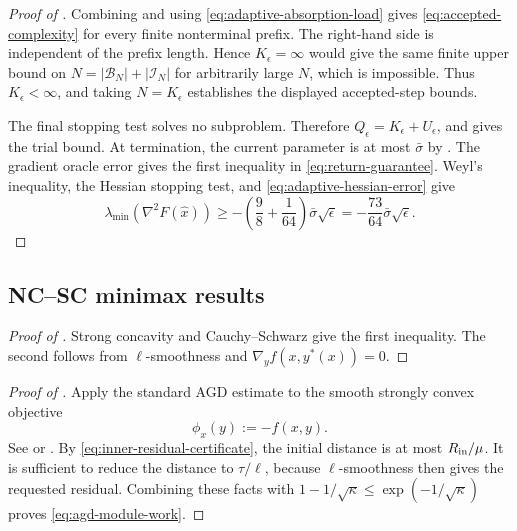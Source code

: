 \documentclass{article}
\begin{document}
\begin{proof}[Proof of ]
Combining  and using
\eqref{eq:adaptive-absorption-load} gives
\eqref{eq:accepted-complexity} for every finite nonterminal prefix.
The right-hand side is independent of the prefix length.  Hence
$K_\epsilon=\infty$ would give the same finite upper bound on
$N=|\mathcal B_N|+|\mathcal I_N|$ for arbitrarily large $N$, which is
impossible.  Thus $K_\epsilon<\infty$, and taking $N=K_\epsilon$
establishes the displayed accepted-step bounds.

The final stopping test solves no subproblem.  Therefore
$Q_\epsilon=K_\epsilon+U_\epsilon$, and
 gives the trial bound.  At termination, the
current parameter is
at most $\bar\sigma$ by .  The gradient
oracle error gives the first inequality in
\eqref{eq:return-guarantee}.  Weyl's inequality, the Hessian stopping
test, and \eqref{eq:adaptive-hessian-error} give
\[
 \lambda_{\min}(\nabla^2F(\widehat x))
 \ge-\left(\frac98+\frac1{64}\right)
       \bar\sigma\sqrt\epsilon
 =-\frac{73}{64}\bar\sigma\sqrt\epsilon.
\]
\end{proof}

\subsection{NC--SC minimax results}

\begin{proof}[Proof of ]
Strong concavity and Cauchy--Schwarz give the first inequality.
The second follows from $\ell$-smoothness and
$\nabla_yf(x,y^*(x))=0$.
\end{proof}

\begin{proof}[Proof of ]
Apply the standard AGD estimate to the smooth strongly convex
objective
\[
 \phi_x(y):=-f(x,y).
\]
See
\citet[Lemma~2]{wang2020improved} or
\citet[Lemma~5]{luo2022finding}.  By
\eqref{eq:inner-residual-certificate}, the initial distance is at most
$R_{\rm in}/\mu$.  It is sufficient to reduce the distance to
$\tau/\ell$, because $\ell$-smoothness then gives the requested
residual.  Combining these facts with
$1-1/\sqrt\kappa\le\exp(-1/\sqrt\kappa)$ proves
\eqref{eq:agd-module-work}.
\end{proof}
\end{document}
